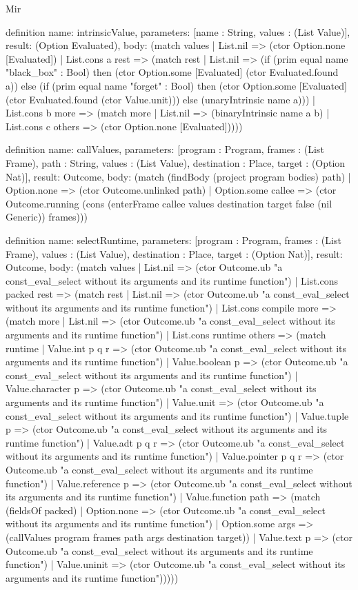 \begin{lexlean}{Mir}
\begin{semanticmodule}
definition{
  name: intrinsicValue,
  parameters: [name : String, values : (List Value)],
  result: (Option Evaluated),
  body: (match values
    | List.nil => (ctor Option.none [Evaluated])
    | List.cons a rest => (match rest
      | List.nil => (if (prim equal name "black_box" : Bool) then (ctor Option.some [Evaluated] (ctor Evaluated.found a)) else (if (prim equal name "forget" : Bool) then (ctor Option.some [Evaluated] (ctor Evaluated.found (ctor Value.unit))) else (unaryIntrinsic name a)))
      | List.cons b more => (match more
        | List.nil => (binaryIntrinsic name a b)
        | List.cons c others => (ctor Option.none [Evaluated]))))
}

definition{
  name: callValues,
  parameters: [program : Program, frames : (List Frame), path : String, values : (List Value), destination : Place, target : (Option Nat)],
  result: Outcome,
  body: (match (findBody (project program bodies) path)
    | Option.none => (ctor Outcome.unlinked path)
    | Option.some callee => (ctor Outcome.running (cons (enterFrame callee values destination target false (nil Generic)) frames)))
}

definition{
  name: selectRuntime,
  parameters: [program : Program, frames : (List Frame), values : (List Value), destination : Place, target : (Option Nat)],
  result: Outcome,
  body: (match values
    | List.nil => (ctor Outcome.ub "a const_eval_select without its arguments and its runtime function")
    | List.cons packed rest => (match rest
      | List.nil => (ctor Outcome.ub "a const_eval_select without its arguments and its runtime function")
      | List.cons compile more => (match more
        | List.nil => (ctor Outcome.ub "a const_eval_select without its arguments and its runtime function")
        | List.cons runtime others => (match runtime
          | Value.int p q r => (ctor Outcome.ub "a const_eval_select without its arguments and its runtime function")
          | Value.boolean p => (ctor Outcome.ub "a const_eval_select without its arguments and its runtime function")
          | Value.character p => (ctor Outcome.ub "a const_eval_select without its arguments and its runtime function")
          | Value.unit => (ctor Outcome.ub "a const_eval_select without its arguments and its runtime function")
          | Value.tuple p => (ctor Outcome.ub "a const_eval_select without its arguments and its runtime function")
          | Value.adt p q r => (ctor Outcome.ub "a const_eval_select without its arguments and its runtime function")
          | Value.pointer p q r => (ctor Outcome.ub "a const_eval_select without its arguments and its runtime function")
          | Value.reference p => (ctor Outcome.ub "a const_eval_select without its arguments and its runtime function")
          | Value.function path => (match (fieldsOf packed) | Option.none => (ctor Outcome.ub "a const_eval_select without its arguments and its runtime function") | Option.some args => (callValues program frames path args destination target))
          | Value.text p => (ctor Outcome.ub "a const_eval_select without its arguments and its runtime function")
          | Value.uninit => (ctor Outcome.ub "a const_eval_select without its arguments and its runtime function")))))
}


\end{semanticmodule}
\end{lexlean}
